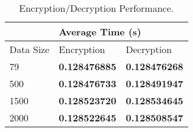 \begin{table}[h!]
	\centering
	\begin{tabular}{|l|l|l|} \cline{2-3}
		\multicolumn{1}{l|}{} & \multicolumn{2}{l|}{Average Time (s)} \\ \hline
		\centering Data Size & Encryption & Decryption  \\ \hline
		79 & \textbf{0.128476885} & \textbf{0.128476268}	      \\ \hline
		500 & \textbf{0.128476733} & \textbf{0.128491947}	      \\ \hline
		1500 & \textbf{0.128523720} & \textbf{0.128534645}	      \\ \hline
		2000 & \textbf{0.128522645} & \textbf{0.128508547}            \\ \hline
	\end{tabular}
	\caption{Encryption/Decryption Performance.}
	\label{tab:data-performance}
\end{table}
